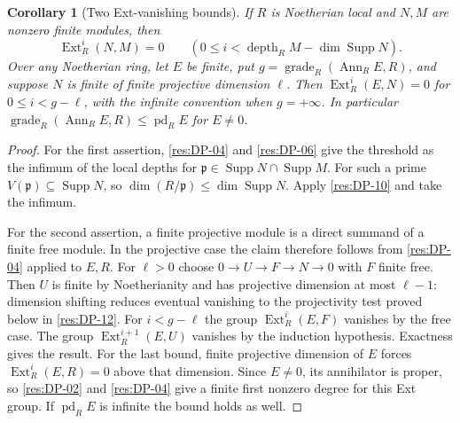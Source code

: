 \documentclass[11pt,oneside,openany]{book}
\newtheorem{corollary}[theorem]{Corollary}
\theoremstyle{definition}
\theoremstyle{remark}
\begin{document}
\begin{corollary}[Two Ext-vanishing bounds]\label{res:DP-11}
If $R$ is Noetherian local and $N,M$ are nonzero finite modules, then
\[
 \operatorname{Ext}^i_R(N,M)=0
   \qquad (0\le i<\operatorname{depth}_R M-\dim\operatorname{Supp}N).
\]
Over any Noetherian ring, let $E$ be finite, put
$g=\operatorname{grade}_R(\operatorname{Ann}_R E,R)$, and suppose
$N$ is finite of finite projective dimension $\ell$. Then
$\operatorname{Ext}^i_R(E,N)=0$ for $0\le i<g-\ell$,
with the infinite convention when $g=+\infty$.
In particular
$\operatorname{grade}_R(\operatorname{Ann}_R E,R)\le
\operatorname{pd}_R E$ for $E\ne0$.
\end{corollary}
\begin{proof}
For the first assertion, \ref{res:DP-04} and \ref{res:DP-06}
give the threshold as the infimum of the local depths for
$\mathfrak p\in\operatorname{Supp}N\cap\operatorname{Supp}M$.
For such a prime $V(\mathfrak p)\subseteq\operatorname{Supp}N$,
so $\dim(R/\mathfrak p)\le\dim\operatorname{Supp}N$.
Apply \ref{res:DP-10} and take the infimum.

For the second assertion, a finite projective module is a direct
summand of a finite free module. In the projective case the claim
therefore follows from \ref{res:DP-04} applied to $E,R$.
For $\ell>0$ choose $0\to U\to F\to N\to0$ with $F$ finite free.
Then $U$ is finite by Noetherianity and has projective dimension at
most $\ell-1$: dimension shifting
\cite[Theorem ALG-10-C02-R04]{p103} reduces eventual vanishing
to the projectivity test proved below in \ref{res:DP-12}.
For $i<g-\ell$ the group $\operatorname{Ext}^i_R(E,F)$ vanishes by
the free case. The group $\operatorname{Ext}^{i+1}_R(E,U)$ vanishes by
the induction hypothesis. Exactness gives the result.
For the last bound, finite projective dimension of $E$ forces
$\operatorname{Ext}_R^i(E,R)=0$ above that dimension. Since $E\ne0$,
its annihilator is proper, so \ref{res:DP-02} and \ref{res:DP-04}
give a finite first nonzero degree for this Ext group. If
$\operatorname{pd}_R E$ is infinite the bound holds as well.
\end{proof}
\end{document}
